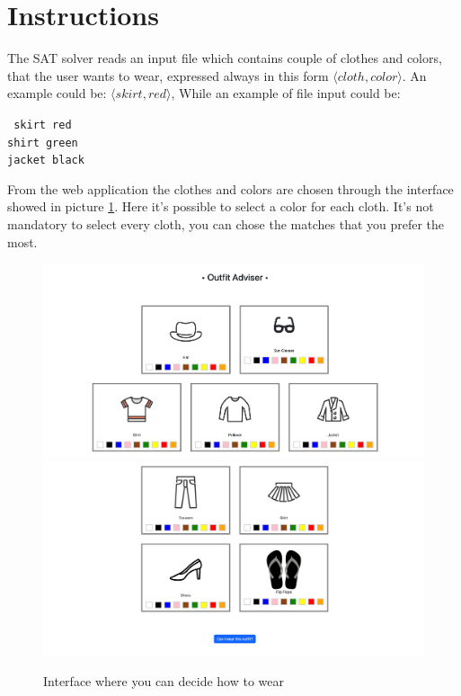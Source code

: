 \documentclass[12pt]{article}
\begin{document}
\section{Instructions}
The SAT solver reads an input file which contains couple of clothes and colors, that the user wants to wear, expressed always in this form $\langle cloth, color \rangle$. An example could be: $\langle skirt, red \rangle$, While an example of file input could be:

\begin{center}
    \texttt{
    skirt red\\
    shirt green\\
    jacket black}
    
\end{center}

From the web application the clothes and colors are chosen through the interface showed in picture \ref{interface}. Here it's possible to select a color for each cloth. It's not mandatory to select every cloth, you can chose the matches that you prefer the most.

\begin{figure}
  \includegraphics[width=\linewidth]{1-interface.png}
  \includegraphics[width=\linewidth]{2-interface.png}
  \caption{Interface where you can decide how to wear}
  \label{interface}
\end{figure}
\end{document}
